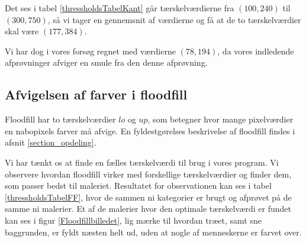 Det ses i tabel \ref{thressholdsTabelKant} går tærskelværdierne
fra $(100,240)$ til $(300,750)$, så vi tager en gennemsnit af værdierne
og få at de to tærskelværdier skal være $(177,384)$. 

Vi har dog i vores forsøg regnet med værdierne $(78,194)$, da vores
indledende afprøvninger afviger en smule fra den denne afprøvning.

\subsection{Afvigelsen af farver i floodfill}
Floodfill har to tærskelværdier $lo$ og $up$, som betegner hvor mange
pixelværdier en nabopixels farver må afvige. En
fyldestgørelses beskrivelse af floodfill findes i afsnit
\ref{section_opdeling}. 

Vi har tænkt os at finde en fælles tærskelværdi til brug i vores
program. Vi observere hvordan floodfill virker med forskellige
tærskelværdier og finder dem, som passer bedst til maleriet. Resultatet
for observationen kan ses i tabel \ref{thressholdsTabelFF}, hvor de
sammen ni kategorier er brugt og afprøvet på de samme ni malerier. Et af
de malerier hvor den optimale tærskelværdi er fundet kan ses i figur
\ref{Floodfillbilledet}, lig mærke til hvordan træet, samt sne
baggrunden, er fyldt næsten helt ud, uden at nogle af menneskerne er
farvet over.

